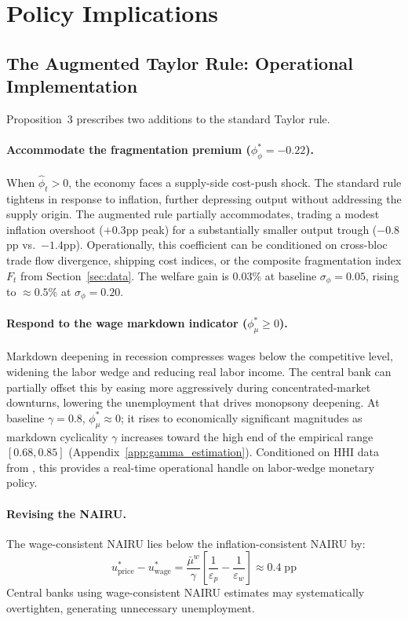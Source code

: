 \section{Policy Implications}
\label{sec:policy}

\subsection{The Augmented Taylor Rule: Operational Implementation}

Proposition~3 prescribes two additions to the standard Taylor rule.

\paragraph{Accommodate the fragmentation premium ($\phi_\phi^* = -0.22$).}
When $\hat\phi_t > 0$, the economy faces a supply-side cost-push shock.
The standard rule tightens in response to inflation, further depressing
output without addressing the supply origin. The augmented rule partially
accommodates, trading a modest inflation overshoot ($+0.3$pp peak) for a
substantially smaller output trough ($-0.8$pp vs.\ $-1.4$pp). Operationally,
this coefficient can be conditioned on cross-bloc trade flow divergence,
shipping cost indices, or the composite fragmentation index $F_t$ from
Section~\ref{sec:data}. The welfare gain is 0.03\% at baseline
$\sigma_\phi = 0.05$, rising to $\approx 0.5\%$ at $\sigma_\phi = 0.20$.

\paragraph{Respond to the wage markdown indicator ($\phi_\mu^* \geq 0$).}
Markdown deepening in recession compresses wages below the competitive level,
widening the labor wedge and reducing real labor income. The central bank can
partially offset this by easing more aggressively during concentrated-market
downturns, lowering the unemployment that drives monopsony deepening. At
baseline $\gamma = 0.8$, $\phi_\mu^* \approx 0$; it rises to economically
significant magnitudes as markdown cyclicality $\gamma$ increases toward the
high end of the empirical range $[0.68, 0.85]$ (Appendix~\ref{app:gamma_estimation}).
Conditioned on HHI data from \citet{azar2020}, this provides a real-time
operational handle on labor-wedge monetary policy.

\paragraph{Revising the NAIRU.}
The wage-consistent NAIRU lies below the inflation-consistent NAIRU by:
\begin{equation}
  u^*_{\text{price}} - u^*_{\text{wage}} = \frac{\bar\mu^w}{\gamma}
  \left[\frac{1}{\varepsilon_p} - \frac{1}{\varepsilon_w}\right] \approx 0.4\;\text{pp}
  \label{eq:nairu_gap}
\end{equation}
Central banks using wage-consistent NAIRU estimates may systematically
overtighten, generating unnecessary unemployment.


